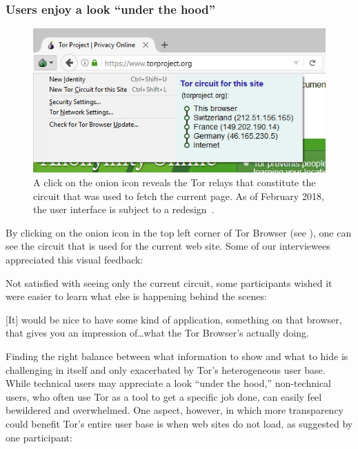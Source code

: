 \subsubsection{Users enjoy a look ``under the hood''}
\label{sec:under-the-hood}

\begin{figure}[t]
    \centering
    \includegraphics[width=\linewidth]{figures/tor-button-screenshot.jpg}
    \caption{A click on the onion icon reveals the Tor relays that constitute
    the circuit that was used to fetch the current page.  As of February 2018,
    the user interface is subject to a redesign~\cite{trac24309}.}
    \label{fig:tor-button}
\end{figure}

By clicking on the onion icon in the top left corner of Tor Browser (see
), one can see the circuit that is used for the current web
site.  Some of our interviewees appreciated this visual feedback:

Not satisfied with seeing only the current circuit, some participants wished it
were easier to learn what else is happening behind the scenes:

\begin{displayquote}[P02]
{[It]} would be nice to have some kind of application, something on that browser,
that gives you an impression of\dots what the Tor Browser's actually doing.
\end{displayquote}

Finding the right balance between what information to show and what to hide is
challenging in itself and only exacerbated by Tor's heterogeneous user base.
While technical users may appreciate a look ``under the hood,'' non-technical
users, who often use Tor as a tool to get a specific job done, can easily feel
bewildered and overwhelmed.  One aspect, however, in which more transparency could
benefit Tor's entire user base is when web sites do not load, as suggested by
one participant:


